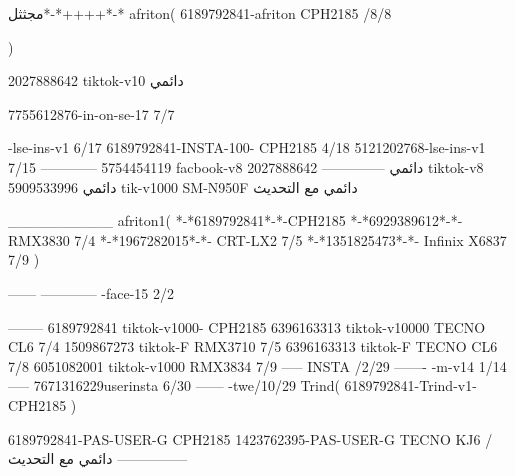 مجثثل*-*++++*-*
afriton(
6189792841-afriton CPH2185  /8/8

)

2027888642 tiktok-v10
دائمي

7755612876-in-on-se-17 7/7

-lse-ins-v1 6/17
6189792841-INSTA-100- CPH2185 4/18
5121202768-lse-ins-v1 7/15
------------
5754454119 facbook-v8
دائمي
--------------
2027888642 tiktok-v8
دائمي
5909533996 tik-v1000  SM-N950F
دائمي مع التحديث

__________
afriton1(
*-*6189792841*-*-CPH2185
*-*6929389612*-*-  RMX3830  7/4
*-*1967282015*-*-  CRT-LX2  7/5
*-*1351825473*-*-  Infinix X6837  7/9
)


------
------------
-face-15 2/2

--------
6189792841 tiktok-v1000- CPH2185 
6396163313 tiktok-v10000 TECNO CL6  7/4
1509867273 tiktok-F RMX3710  7/5
6396163313 tiktok-F TECNO CL6  7/8
6051082001 tiktok-v1000 RMX3834  7/9
-----
 INSTA /2/29
-------
-m-v14 1/14
-----
7671316229userinsta 6/30
------
-twe/10/29
Trind(
6189792841-Trind-v1- CPH2185 
)


6189792841-PAS-USER-G CPH2185 
1423762395-PAS-USER-G TECNO KJ6  /دائمي مع التحديث
    ---------------

